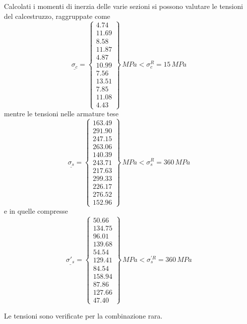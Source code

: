 Calcolati i momenti di inerzia delle varie sezioni si possono valutare le tensioni del calcestruzzo, raggruppate come
\[
\underline{\sigma_c} = 
\begin{Bmatrix}
	4.74\\11.69\\8.58\\11.87\\4.87\\10.99\\7.56\\13.51\\7.85\\11.08\\4.43
\end{Bmatrix}\,MPa < \sigma_c^R = 15\,MPa
\]
mentre le tensioni nelle armature tese
\[
\underline{\sigma_s} = 
\begin{Bmatrix}
	163.49\\291.90\\247.15\\263.06\\140.39\\243.71\\217.63\\299.33\\226.17\\276.52\\152.96
\end{Bmatrix}\,MPa < \sigma_s^R = 360\,MPa
\]
e in quelle compresse
\[
\underline{\sigma'_s} = 
\begin{Bmatrix}
	50.66\\134.75\\96.01\\139.68\\54.54\\129.41\\84.54\\158.94\\87.86\\127.66\\47.40
\end{Bmatrix}\,MPa < \sigma_s^{'R} = 360\,MPa
\]

Le tensioni sono verificate per la combinazione rara.

